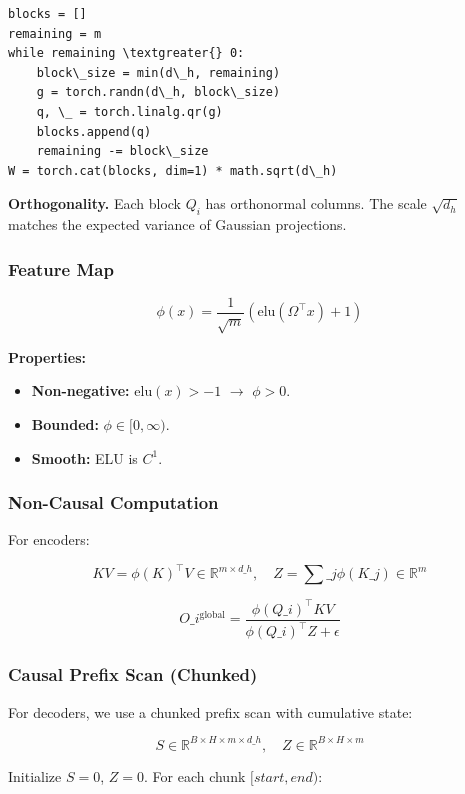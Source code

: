 \begin{lstlisting}
blocks = []
remaining = m
while remaining \textgreater{} 0:
    block\_size = min(d\_h, remaining)
    g = torch.randn(d\_h, block\_size)
    q, \_ = torch.linalg.qr(g)
    blocks.append(q)
    remaining -= block\_size
W = torch.cat(blocks, dim=1) * math.sqrt(d\_h)
\end{lstlisting}

\textbf{Orthogonality.} Each block $Q_i$ has orthonormal columns. The scale 
$\sqrt{d_h}$ matches the expected variance of Gaussian projections.

\subsubsection{Feature Map}

\[
\phi(x) = \frac{1}{\sqrt{m}} \left(\mathrm{elu}(\Omega^\top x) + 1\right)
\tag{4.4}
\]

\textbf{Properties:}
\begin{itemize}
\item \textbf{Non-negative:} $\mathrm{elu}(x) > -1$ $\to$ $\phi > 0$.
\item \textbf{Bounded:} $\phi \in [0, \infty)$.
\item \textbf{Smooth:} ELU is $C^1$.

\end{itemize}
\subsubsection{Non-Causal Computation}

For encoders:

\[
KV = \phi(K)^\top V \in \mathbb{R}^{m \times d\_h}, \quad
Z = \sum\_j \phi(K\_j) \in \mathbb{R}^m
\tag{4.5}
\]

\[
O\_i^\text{global} = \frac{\phi(Q\_i)^\top KV}{\phi(Q\_i)^\top Z + \epsilon}
\tag{4.6}
\]

\subsubsection{Causal Prefix Scan (Chunked)}

For decoders, we use a chunked prefix scan with cumulative state:

\[
S \in \mathbb{R}^{B \times H \times m \times d\_h}, \quad
Z \in \mathbb{R}^{B \times H \times m}
\]

Initialize $S = 0$, $Z = 0$. For each chunk $[start, end)$:

